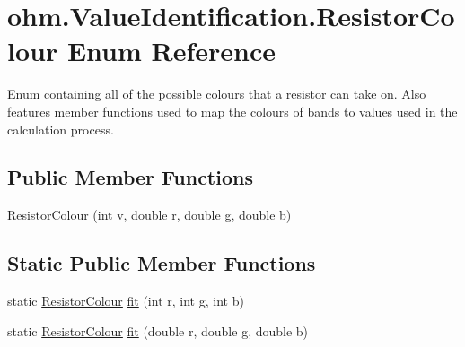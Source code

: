 \hypertarget{enumohm_1_1_value_identification_1_1_resistor_colour}{}\section{ohm.\+Value\+Identification.\+Resistor\+Colour Enum Reference}
\label{enumohm_1_1_value_identification_1_1_resistor_colour}


Enum containing all of the possible colours that a resistor can take on. Also features member functions used to map the colours of bands to values used in the calculation process.  


\subsection*{Public Member Functions}
\begin{DoxyCompactItemize}
\item 
\hyperlink{enumohm_1_1_value_identification_1_1_resistor_colour_a55d151fdd193107e23c51646774744a8}{Resistor\+Colour} (int v, double r, double g, double b)
\end{DoxyCompactItemize}
\subsection*{Static Public Member Functions}
\begin{DoxyCompactItemize}
\item 
static \hyperlink{enumohm_1_1_value_identification_1_1_resistor_colour}{Resistor\+Colour} \hyperlink{enumohm_1_1_value_identification_1_1_resistor_colour_aead22df994fb608ab337abbac6f19b7d}{fit} (int r, int g, int b)
\item 
static \hyperlink{enumohm_1_1_value_identification_1_1_resistor_colour}{Resistor\+Colour} \hyperlink{enumohm_1_1_value_identification_1_1_resistor_colour_acd456d0acac74c0dc7ad3c13eafdb6d0}{fit} (double r, double g, double b)
\end{DoxyCompactItemize}

